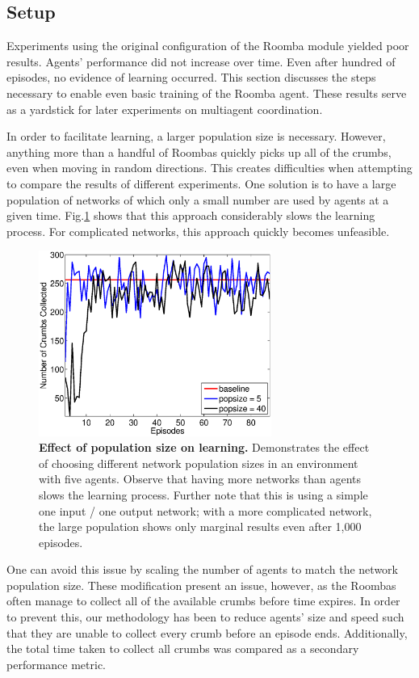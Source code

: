 \documentclass[conference]{IEEEtran}
\begin{document}
\subsection{Setup}

Experiments using the original configuration of the Roomba module yielded poor results. Agents' performance did not increase over time.  Even after hundred of episodes, no evidence of learning occurred. This section discusses the steps necessary to enable even basic training of the Roomba agent. These results serve as a yardstick for later experiments on multiagent coordination.

In order to facilitate learning, a larger population size is necessary. 
However, anything more than a handful of Roombas quickly picks up all of the crumbs, even when moving in random directions. This creates difficulties when attempting to compare the results of different experiments.
One solution is to have a large population of networks of which only a small number are used by agents at a given time. Fig.\ref{neroevolution:pop_size} shows that this approach considerably slows the learning process. For complicated networks, this approach quickly becomes unfeasible.

\begin{figure}[!t]
\centering
\includegraphics[width=3.0in]{./figures/neroevolution/pop_size.eps}
\caption{\textbf{Effect of population size on learning.} Demonstrates the effect of choosing different network population sizes in an environment with five agents. Observe that having more networks than agents slows the learning process. Further note that this is using a simple one input / one output network; with a more complicated network, the large population shows only marginal results even after 1,000 episodes.}
\label{neroevolution:pop_size}
\end{figure}

One can avoid this issue by scaling the number of agents to match the network population size. These modification present an issue, however, as the Roombas often manage to collect all of the available crumbs before time expires. In order to prevent this, our methodology has been to reduce agents' size and speed such that they are unable to collect every crumb before an episode ends. Additionally, the total time taken to collect all crumbs was compared as a secondary performance metric.
\end{document}
